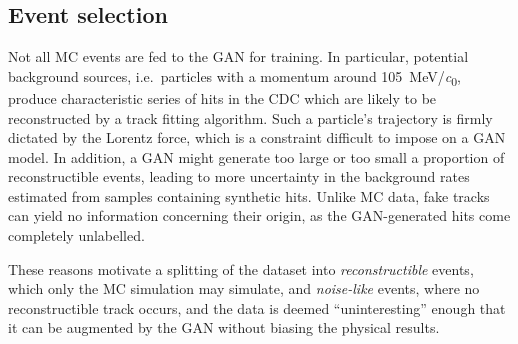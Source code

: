 
\subsection{Event selection}


Not all MC events are fed to the GAN for training. In particular, potential
background sources, i.e.\ particles with a momentum around
\SI{105}{MeV/\clight}, produce characteristic series of hits in the CDC which
are likely to be reconstructed by a track fitting algorithm. Such a particle's
trajectory is firmly dictated by the Lorentz force, which is a constraint
difficult to impose on a GAN model. In addition, a GAN might generate too large
or too small a proportion of reconstructible events, leading to more uncertainty
in the background rates estimated from samples containing synthetic hits. Unlike
MC data, fake tracks can yield no information concerning their origin, as the
GAN-generated hits come completely unlabelled.

These reasons motivate a splitting of the dataset into \emph{reconstructible}
events, which only the MC simulation may simulate, and \emph{noise-like} events,
where no reconstructible track occurs, and the data is deemed ``uninteresting''
enough that it can be augmented by the GAN without biasing the physical results.


